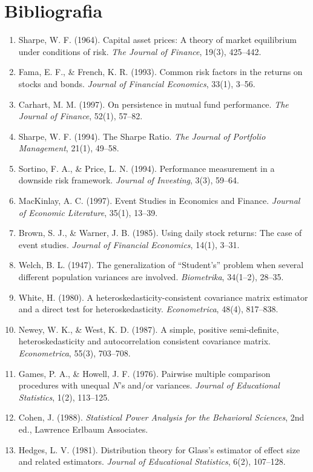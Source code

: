 \documentclass[11pt,a4paper]{article}
\begin{document}
\section{Bibliografia}
\begin{enumerate}
  \item Sharpe, W. F. (1964). Capital asset prices: A theory of market
        equilibrium under conditions of risk. \emph{The Journal of Finance},
        19(3), 425--442.
  \item Fama, E. F., \& French, K. R. (1993). Common risk factors in the
        returns on stocks and bonds. \emph{Journal of Financial Economics},
        33(1), 3--56.
  \item Carhart, M. M. (1997). On persistence in mutual fund performance.
        \emph{The Journal of Finance}, 52(1), 57--82.
  \item Sharpe, W. F. (1994). The Sharpe Ratio. \emph{The Journal of Portfolio
        Management}, 21(1), 49--58.
  \item Sortino, F. A., \& Price, L. N. (1994). Performance measurement in a
        downside risk framework. \emph{Journal of Investing}, 3(3), 59--64.

  \item MacKinlay, A. C. (1997). Event Studies in Economics and Finance.
        \emph{Journal of Economic Literature}, 35(1), 13--39.
  \item Brown, S. J., \& Warner, J. B. (1985). Using daily stock returns:
        The case of event studies. \emph{Journal of Financial Economics},
        14(1), 3--31.

  \item Welch, B. L. (1947). The generalization of ``Student's'' problem when
        several different population variances are involved. \emph{Biometrika},
        34(1--2), 28--35.
  \item White, H. (1980). A heteroskedasticity-consistent covariance matrix
        estimator and a direct test for heteroskedasticity.
        \emph{Econometrica}, 48(4), 817--838.
  \item Newey, W. K., \& West, K. D. (1987). A simple, positive semi-definite,
        heteroskedasticity and autocorrelation consistent covariance matrix.
        \emph{Econometrica}, 55(3), 703--708.
  \item Games, P. A., \& Howell, J. F. (1976). Pairwise multiple comparison
        procedures with unequal $N$'s and/or variances. \emph{Journal of
        Educational Statistics}, 1(2), 113--125.
  \item Cohen, J. (1988). \emph{Statistical Power Analysis for the Behavioral
        Sciences}, 2nd ed., Lawrence Erlbaum Associates.
  \item Hedges, L. V. (1981). Distribution theory for Glass's estimator of
        effect size and related estimators. \emph{Journal of Educational
        Statistics}, 6(2), 107--128.


\end{enumerate}
\end{document}
